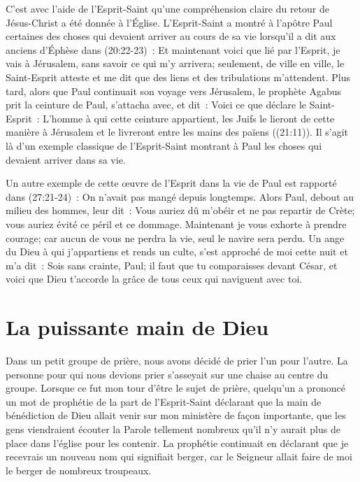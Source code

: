 \begin{specialpar}{}
C'est avec l'aide de l'Esprit-Saint qu'une compréhension claire
 du retour de Jésus-Christ a été donnée à l'Église.
 L'Esprit-Saint a montré à l'apôtre Paul certaines des choses
 qui devaient arriver au cours de sa vie lorsqu'il a dit aux anciens d'Éphèse
 dans (20:22-23)~:
 \og Et maintenant voici que lié par l'Esprit, je vais à Jérusalem,
 sans savoir ce qui m'y arrivera; seulement, de ville en ville,
 le Saint-Esprit atteste et me dit que des liens
 et des tribulations m'attendent. \fg{}
 Plus tard, alors que Paul continuait son voyage vers Jérusalem,
 le prophète Agabus prit la ceinture de Paul, s'attacha avec, et dit~:
 \og Voici ce que déclare le Saint-Esprit~:
 L'homme à qui cette ceinture appartient, les Juifs le lieront
 de cette manière à Jérusalem et le livreront
 entre les mains des païens \fg{} ((21:11)).
 Il s'agit là d'un exemple classique de l'Esprit-Saint montrant à Paul
 les choses qui devaient arriver dans sa vie.
\end{specialpar}

Un autre exemple de cette œuvre de l'Esprit dans la vie de Paul
 est rapporté dans (27:21-24)~:
 \og On n'avait pas mangé depuis longtemps.
 Alors Paul, debout au milieu des hommes, leur dit~:
 Vous auriez dû m'obéir et ne pas repartir de Crète;
 vous auriez évité ce péril et ce dommage.
 Maintenant je vous exhorte à prendre courage;
 car aucun de vous ne perdra la vie, seul le navire sera perdu.
 Un ange du Dieu à qui j'appartiens et rends un culte,
 s'est approché de moi cette nuit et m'a dit~:
 Sois sans crainte, Paul; il faut que tu comparaisses devant César,
 et voici que Dieu t'accorde la grâce de tous ceux qui naviguent avec toi. \fg{}


\section{La puissante main de Dieu}

Dans un petit groupe de prière, nous avons décidé de prier
 l'un pour l'autre.
 La personne pour qui nous devions prier s'asseyait sur une chaise
 au centre du groupe. Lorsque ce fut mon tour d'être le sujet de prière,
 quelqu'un a prononcé un mot de prophétie de la part de l'Esprit-Saint
 déclarant que la main de bénédiction de Dieu allait venir
 sur mon ministère de façon importante, que les gens viendraient écouter
 la Parole tellement nombreux qu'il n'y aurait plus de place dans l'église
 pour les contenir.
 La prophétie continuait en déclarant que je recevrais un nouveau nom
 qui signifiait berger, car le Seigneur allait faire de moi le berger
 de nombreux troupeaux.

